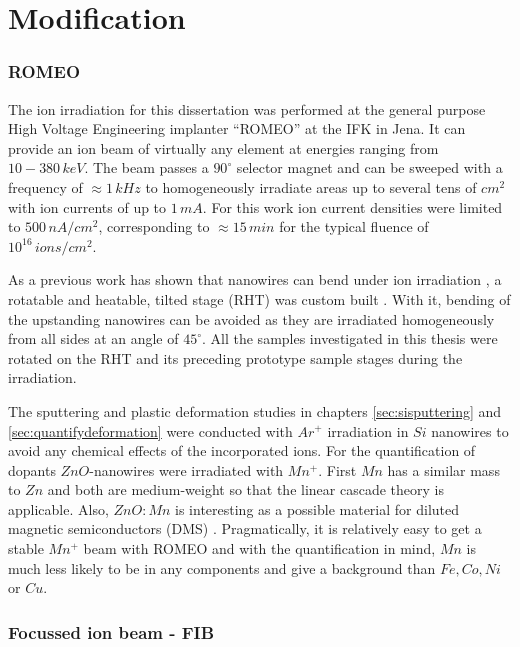 \section{Modification}


\subsubsection{ROMEO}


The ion irradiation for this dissertation was performed at the general purpose High Voltage Engineering implanter ``ROMEO'' at the IFK in Jena. It can provide an ion beam of virtually any element at energies ranging from $10-380\,keV$. The beam passes a $90^\circ$ selector magnet and can be sweeped with a frequency of $\approx 1\,kHz$ to homogeneously irradiate areas up to several tens of $cm^2$ with ion currents of up to $1\,mA$. For this work ion current densities were limited to $500\,nA/cm^2$, corresponding to $\approx 15\,min$ for the typical fluence of $10^{16}\,ions/cm^2$.

As a previous work has shown that nanowires can bend under ion irradiation \cite{borschel_permanent_2011, borschel_ion-solid_2012}, a rotatable and heatable, tilted stage (RHT) was custom built \cite{noack_sputter_2014}. With it, bending of the upstanding nanowires can be avoided as they are irradiated homogeneously from all sides at an angle of $45^\circ$. All the samples investigated in this thesis were rotated on the RHT and its preceding prototype sample stages during the irradiation. 

The sputtering and plastic deformation studies in chapters \ref{sec:sisputtering} and \ref{sec:quantifydeformation} were conducted with $Ar^+$ irradiation in $Si$ nanowires to avoid any chemical effects of the incorporated ions. For the quantification of dopants $ZnO$-nanowires were irradiated with $Mn^+$. First $Mn$ has a similar mass to $Zn$ and both are medium-weight so that the linear cascade theory is applicable. Also, $ZnO:Mn$ is interesting as a possible material for diluted magnetic semiconductors (DMS) \cite{furdyna_diluted_1988,norberg_synthesis_2004}. Pragmatically, it is relatively easy to get a stable $Mn^+$ beam with ROMEO and with the quantification in mind, $Mn$ is much less likely to be in any components and give a background than $Fe, Co, Ni$ or $Cu$.

 

\subsubsection{Focussed ion beam - FIB}

